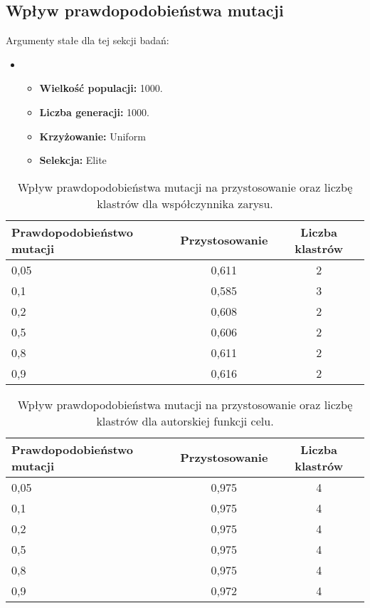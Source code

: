 \documentclass{classrep}
\begin{document}
\subsection{Wpływ prawdopodobieństwa mutacji}


Argumenty stałe dla tej sekcji badań:
\begin{itemize}
    \item[]
    \begin{itemize}
        \item \textbf{Wielkość populacji:} 1000.
        \item \textbf{Liczba generacji:} 1000.
        \item \textbf{Krzyżowanie:} Uniform
        \item \textbf{Selekcja:} Elite
    \end{itemize}
\end{itemize}

\begin{table}[H]
\centering
\caption{Wpływ prawdopodobieństwa mutacji na przystosowanie oraz liczbę klastrów dla współczynnika zarysu.}
\begin{tabular}{|p{4.5cm}|c|c|}
\hline
\textbf{Prawdopodobieństwo mutacji} & {\textbf{Przystosowanie}} & {\textbf{Liczba klastrów}} \\ \hline
0,05 & 0,611 & 2 \\ \hline
0,1 & 0,585 & 3 \\ \hline
0,2 & 0,608 & 2 \\ \hline
0,5 & 0,606 & 2 \\ \hline
0,8 & 0,611 & 2 \\ \hline
0,9 & 0,616 & 2 \\ \hline
\end{tabular}
\label{tab:calc5_1}
\end{table}

\begin{table}[H]
\centering
\caption{Wpływ prawdopodobieństwa mutacji na przystosowanie oraz liczbę klastrów dla autorskiej funkcji celu.}
\begin{tabular}{|p{4.5cm}|c|c|}
\hline
\textbf{Prawdopodobieństwo mutacji} & {\textbf{Przystosowanie}} & {\textbf{Liczba klastrów}} \\ \hline
0,05 & 0,975 & 4 \\ \hline
0,1 & 0,975 & 4 \\ \hline
0,2 & 0,975 & 4 \\ \hline
0,5 & 0,975 & 4 \\ \hline
0,8 & 0,975 & 4 \\ \hline
0,9 & 0,972 & 4 \\ \hline
\end{tabular}
\label{tab:calc5_2}
\end{table}
\end{document}

